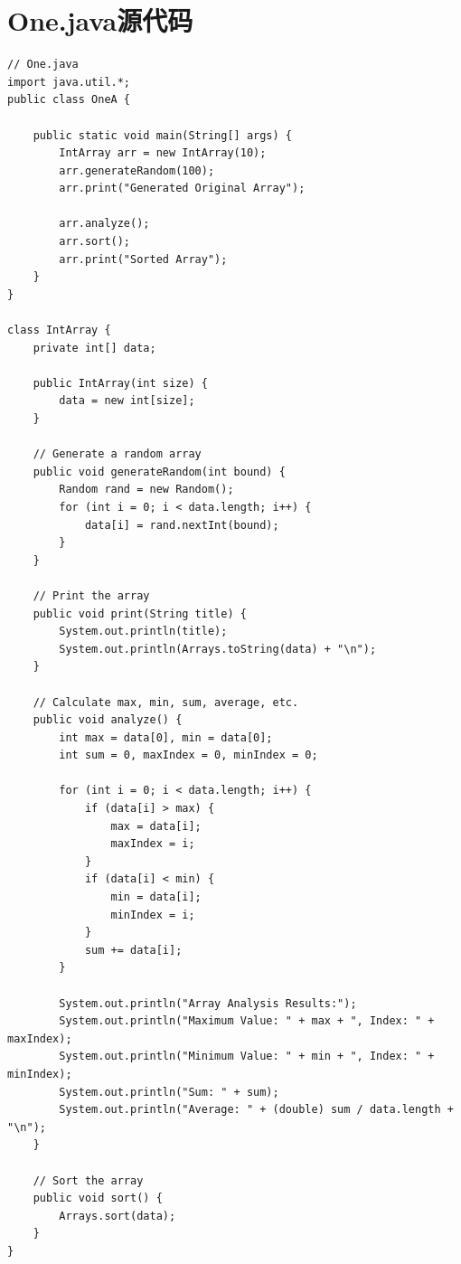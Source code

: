 \documentclass[12pt,a4paper]{article}
\begin{document}
\section*{One.java源代码}\label{sec:one}
\begin{lstlisting}
// One.java
import java.util.*;
public class OneA {

    public static void main(String[] args) {
        IntArray arr = new IntArray(10);
        arr.generateRandom(100);  
        arr.print("Generated Original Array");

        arr.analyze();
        arr.sort(); 
        arr.print("Sorted Array");
    }
}

class IntArray {
    private int[] data;

    public IntArray(int size) {
        data = new int[size];
    }

    // Generate a random array
    public void generateRandom(int bound) {
        Random rand = new Random();
        for (int i = 0; i < data.length; i++) {
            data[i] = rand.nextInt(bound);
        }
    }

    // Print the array
    public void print(String title) {
        System.out.println(title);
        System.out.println(Arrays.toString(data) + "\n");
    }

    // Calculate max, min, sum, average, etc.
    public void analyze() {
        int max = data[0], min = data[0];
        int sum = 0, maxIndex = 0, minIndex = 0;

        for (int i = 0; i < data.length; i++) {
            if (data[i] > max) {
                max = data[i];
                maxIndex = i;
            }
            if (data[i] < min) {
                min = data[i];
                minIndex = i;
            }
            sum += data[i];
        }

        System.out.println("Array Analysis Results:");
        System.out.println("Maximum Value: " + max + ", Index: " + maxIndex);
        System.out.println("Minimum Value: " + min + ", Index: " + minIndex);
        System.out.println("Sum: " + sum);
        System.out.println("Average: " + (double) sum / data.length + "\n");
    }

    // Sort the array
    public void sort() {
        Arrays.sort(data);
    }
}
\end{lstlisting}
\end{document}
